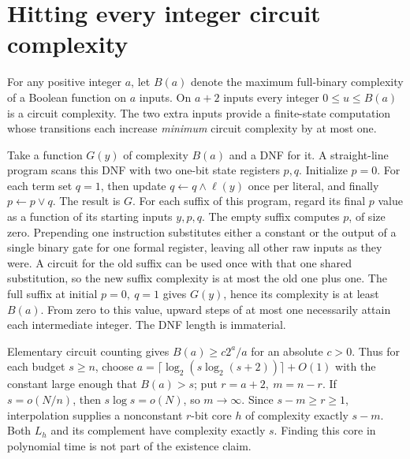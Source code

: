 \documentclass[11pt]{article}
\begin{document}
\section{Hitting every integer circuit complexity}
For any positive integer \(a\), let \(B(a)\) denote the maximum full-binary complexity of a Boolean function on \(a\) inputs. On \(a+2\) inputs every integer \(0\le u\le B(a)\) is a circuit complexity. The two extra inputs provide a finite-state computation whose transitions each increase \emph{minimum} circuit complexity by at most one.

Take a function \(G(y)\) of complexity \(B(a)\) and a DNF for it. A straight-line program scans this DNF with two one-bit state registers \(p,q\). Initialize \(p=0\). For each term set \(q=1\), then update \(q\gets q\wedge\ell(y)\) once per literal, and finally \(p\gets p\vee q\). The result is \(G\). For each suffix of this program, regard its final \(p\) value as a function of its starting inputs \(y,p,q\). The empty suffix computes \(p\), of size zero. Prepending one instruction substitutes either a constant or the output of a single binary gate for one formal register, leaving all other raw inputs as they were. A circuit for the old suffix can be used once with that one shared substitution, so the new suffix complexity is at most the old one plus one. The full suffix at initial \(p=0,\ q=1\) gives \(G(y)\), hence its complexity is at least \(B(a)\). From zero to this value, upward steps of at most one necessarily attain each intermediate integer. The DNF length is immaterial.

Elementary circuit counting gives \(B(a)\ge c2^a/a\) for an absolute \(c>0\). Thus for each budget \(s\ge n\), choose \(a=\lceil\log_2(s\log_2(s+2))\rceil+O(1)\) with the constant large enough that \(B(a)>s\); put \(r=a+2,\ m=n-r\). If \(s=o(N/n)\), then \(s\log s=o(N)\), so \(m\to\infty\). Since \(s-m\ge r\ge1\), interpolation supplies a nonconstant \(r\)-bit core \(h\) of complexity exactly \(s-m\). Both \(L_h\) and its complement have complexity exactly \(s\). Finding this core in polynomial time is not part of the existence claim.
\end{document}
